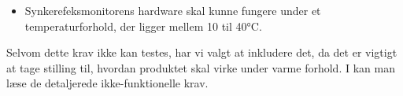 \begin{itemize}
\item  Synkerefeksmonitorens hardware skal kunne fungere under et temperaturforhold, der ligger mellem 10 til 40°C.
\end{itemize}

Selvom dette krav ikke kan testes, har vi valgt at inkludere det, da det er vigtigt at tage stilling til, hvordan produktet skal virke under varme forhold. I  kan man læse de detaljerede ikke-funktionelle krav.

 


 

